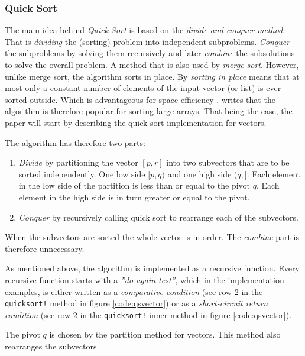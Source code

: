 \documentclass[a4paper, 11pt]{article}
\begin{document}
    \subsubsection*{Quick Sort}
    The main idea behind \emph{Quick Sort} is based on the 
    \emph{divide-and-conquer method}. 
    That is \emph{dividing} the (sorting) problem into independent subproblems. 
    \emph{Conquer} the subproblems by solving them recursively and later \emph{combine} the 
    subsolutions to solve the overall problem. A method that is also used by
    \emph{merge sort}. However, unlike merge sort, the algorithm sorts in place. 
    By \emph{sorting in place} means that at most only 
    a constant number of elements of the
    input vector (or list) is ever sorted outside.
    Which is advantageous for space efficiency \parencite{CormenThomasH2022ItA}.
    \textcite{CormenThomasH2022ItA} writes that the algorithm is therefore 
    popular for sorting large arrays. That being the case, the paper will 
    start by describing the quick sort implementation for vectors.

    The algorithm has therefore two parts:
    \begin{enumerate}
        \item \emph{Divide} by partitioning the vector $[p, r]$ into 
        two subvectors that are to be sorted independently. 
        One low side $[p,q)$ and one high side $(q,]$. 
        Each element in the low side of the partition is 
        less than or equal to the pivot $q$. Each element in
        the high side is in turn greater or equal to the pivot.
        \item \emph{Conquer} by recursively calling quick sort to rearrange 
        each of the subvectors.
    \end{enumerate}
    
    When the subvectors are sorted 
    the whole vector is in order. The \emph{combine} part is
    therefore unnecessary.

    As mentioned above, the algorithm is implemented as a recursive function. 
    Every recursive function starts with a \emph{''do-again-test''},
    which in the implementation examples, 
    is either written as a \emph{comparative condition}
    (see row 2 in the \texttt{quicksort!} method in figure
    \autoref{code:qsvector}) or as a 
    \emph{short-circuit return condition} 
    (see row 2 in the \texttt{quicksort!} inner method in figure
    \autoref{code:qsvector}).

    The pivot $q$ is chosen by 
    the partition method for vectors. This method also rearranges the 
    subvectors.
\end{document}
